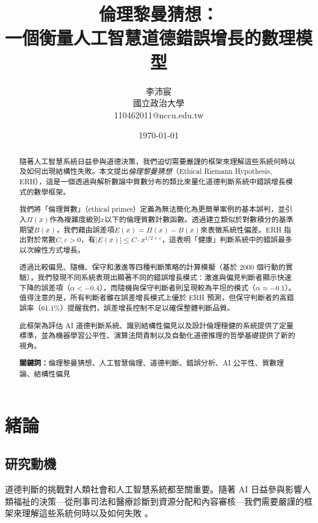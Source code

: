 \documentclass[12pt,a4paper]{article}
\title{倫理黎曼猜想：\\
       一個衡量人工智慧道德錯誤增長的數理模型}
\author{李沛宸 \\
        國立政治大學 \\
        110462011@nccu.edu.tw}
\date{\today}
\theoremstyle{definition}
\theoremstyle{remark}
\begin{document}
\maketitle

\begin{abstract}
隨著人工智慧系統日益參與道德決策，我們迫切需要嚴謹的框架來理解這些系統何時以及如何出現結構性失敗。本文提出\emph{倫理黎曼猜想}（Ethical Riemann Hypothesis, ERH），這是一個透過與解析數論中質數分布的類比來量化道德判斷系統中錯誤增長模式的數學框架。

我們將「倫理質數」（ethical primes）定義為無法簡化為更簡單案例的基本誤判，並引入$\Pi(x)$作為複雜度級別$x$以下的倫理質數計數函數。透過建立類似於對數積分的基準期望$B(x)$，我們藉由誤差項$E(x) = \Pi(x) - B(x)$來表徵系統性偏差。ERH 指出對於常數$C, \varepsilon > 0$，有$|E(x)| \leq C \cdot x^{1/2 + \varepsilon}$，這表明「健康」判斷系統中的錯誤最多以次線性方式增長。

透過比較偏見、隨機、保守和激進等四種判斷策略的計算模擬（基於 2000 個行動的實驗），我們發現不同系統表現出顯著不同的錯誤增長模式：激進與偏見判斷者顯示快速下降的誤差項（$\alpha < -0.4$），而隨機與保守判斷者則呈現較為平坦的模式（$\alpha \approx -0.1$）。值得注意的是，所有判斷者雖在誤差增長模式上優於 ERH 預測，但保守判斷者的高錯誤率（61.1\%）提醒我們，誤差增長控制不足以確保整體判斷品質。

此框架為評估 AI 道德判斷系統、識別結構性偏見以及設計倫理穩健的系統提供了定量標準，並為機器學習公平性、演算法問責制以及自動化道德推理的哲學基礎提供了新的視角。

\textbf{關鍵詞：}倫理黎曼猜想、人工智慧倫理、道德判斷、錯誤分析、AI 公平性、質數理論、結構性偏見
\end{abstract}

\section{緒論}
\label{sec:introduction}

\subsection{研究動機}

道德判斷的挑戰對人類社會和人工智慧系統都至關重要。隨著 AI 日益參與影響人類福祉的決策---從刑事司法和醫療診斷到資源分配和內容審核---我們需要嚴謹的框架來理解這些系統何時以及如何失敗 \citep{jobin2019,floridi2018}。
\end{document}
